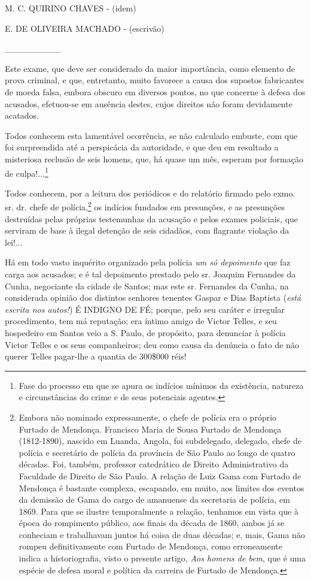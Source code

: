 M. C. QUIRINO CHAVES - (idem)

E. DE OLIVEIRA MACHADO - (escrivão)

\_\_\_\_\_\_\_\_\_

Este exame, que deve ser considerado da maior importância, como elemento
de prova criminal, e que, entretanto, muito favorece a causa dos
supostos fabricantes de moeda falsa, embora obscuro em diversos pontos,
no que concerne à defesa dos acusados, efetuou-se em ausência destes,
cujos direitos não foram devidamente acatados.

Todos conhecem esta lamentável ocorrência, se não calculado embuste, com
que foi surpreendida até a perspicácia da autoridade, e que deu em
resultado a misteriosa reclusão de seis homens, que, há quase um mês,
esperam por formação de culpa!...\footnote{Fase do processo em que se
  apura os indícios mínimos da existência, natureza e circunstâncias do
  crime e de seus potenciais agentes.}

Todos conhecem, por a leitura dos periódicos e do relatório firmado pelo
exmo. sr. dr. chefe de polícia,\footnote{Embora não nominado
  expressamente, o chefe de polícia era o próprio Furtado de Mendonça.
  Francisco Maria de Sousa Furtado de Mendonça (1812-1890), nascido em
  Luanda, Angola, foi subdelegado, delegado, chefe de polícia e
  secretário de polícia da província de São Paulo ao longo de quatro
  décadas. Foi, também, professor catedrático de Direito Administrativo
  da Faculdade de Direito de São Paulo. A relação de Luiz Gama com
  Furtado de Mendonça é bastante complexa, escapando, em muito, aos
  limites dos eventos da demissão de Gama do cargo de amanuense da
  secretaria de polícia, em 1869. Para que se ilustre temporalmente a
  relação, tenhamos em vista que à época do rompimento público, aos
  finais da década de 1860, ambos já se conheciam e trabalhavam juntos
  há coisa de duas décadas; e, mais, Gama não rompeu definitivamente com
  Furtado de Mendonça, como erroneamente indica a historiografia, visto
  o presente artigo, \emph{Aos homens de bem}, que é uma espécie de
  defesa moral e política da carreira de Furtado de Mendonça.} os
indícios fundados em presunções, e as presunções destruídas pelas
próprias testemunhas da acusação e pelos exames policiais, que serviram
de base à ilegal detenção de seis cidadãos, com flagrante violação da
lei!...

Há em todo vasto inquérito organizado pela polícia \emph{um só
depoimento} que faz carga aos acusados; e é tal depoimento prestado pelo
sr. Joaquim Fernandes da Cunha, negociante da cidade de Santos; mas este
sr. Fernandes da Cunha, na considerada opinião dos distintos senhores
tenentes Gaspar e Dias Baptista (\emph{está escrita nos autos!}) É
INDIGNO DE FÉ; porque, pelo seu caráter e irregular procedimento, tem má
reputação; era íntimo amigo de Victor Telles, e seu hospedeiro em Santos
veio a S. Paulo, de propósito, para denunciar à polícia Victor Telles e
os seus companheiros; deu como causa da denúncia o fato de não querer
Telles pagar-lhe a quantia de 300\$000 réis!

